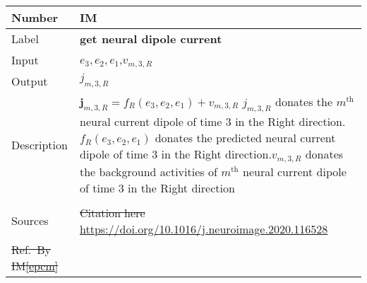 \documentclass[12pt]{article}
\makeatletter
\newcommand{\colAwidth}{0.13\textwidth}
\newcommand{\colBwidth}{0.82\textwidth}
\newcounter{instnum} %
\newcommand{\iref}[1]{IM\ref{#1}}
\providecommand{\DIFdeltex}[1]{{\protect\color{red}\sout{#1}}} %
\providecommand{\DIFaddbegin}{} %
\providecommand{\DIFaddend}{} %
\providecommand{\DIFdelbegin}{} %
\providecommand{\DIFdelend}{} %
\providecommand{\DIFdel}[1]{\texorpdfstring{\DIFdeltex{#1}}{}} %
\newcommand{\DIFscaledelfig}{0.5}
\newlength{\DIFdelgraphicswidth} %
\newlength{\DIFdelgraphicsheight} %
\newcommand{\DIFaddincludegraphics}[2][]{{\color{blue}\fbox{\DIFOincludegraphics[#1]{#2}}}} %
\newcommand{\DIFdelincludegraphics}[2][]{%
\sbox{\DIFdelgraphicsbox}{\DIFOincludegraphics[#1]{#2}}%
\settoboxwidth{\DIFdelgraphicswidth}{\DIFdelgraphicsbox} %
\settoboxtotalheight{\DIFdelgraphicsheight}{\DIFdelgraphicsbox} %
\scalebox{\DIFscaledelfig}{%
\parbox[b]{\DIFdelgraphicswidth}{\usebox{\DIFdelgraphicsbox}\\[-\baselineskip] \rule{\DIFdelgraphicswidth}{0em}}\llap{\resizebox{\DIFdelgraphicswidth}{\DIFdelgraphicsheight}{%
\setlength{\unitlength}{\DIFdelgraphicswidth}%
\begin{picture}(1,1)%
\thicklines\linethickness{2pt} %
{\color[rgb]{1,0,0}\put(0,0){\framebox(1,1){}}}%
{\color[rgb]{1,0,0}\put(0,0){\line( 1,1){1}}}%
{\color[rgb]{1,0,0}\put(0,1){\line(1,-1){1}}}%
\end{picture}%
}\hspace*{3pt}}} %
} %
\DeclareRobustCommand{\DIFaddbegin}{\DIFOaddbegin \let\includegraphics\DIFaddincludegraphics} %
\DeclareRobustCommand{\DIFaddend}{\DIFOaddend \let\includegraphics\DIFOincludegraphics} %
\DeclareRobustCommand{\DIFdelbegin}{\DIFOdelbegin \let\includegraphics\DIFdelincludegraphics} %
\DeclareRobustCommand{\DIFdelend}{\DIFOaddend \let\includegraphics\DIFOincludegraphics} %
\let\sout@orig\sout %
\renewcommand{\sout}[1]{\ifmmode\text{\sout@orig{\ensuremath{#1}}}\else\sout@orig{#1}\fi} %
\makeatother
\begin{document}
~\newline


\noindent
\renewcommand*{\arraystretch}{1.5}%
\begin{tabular}{| p{\colAwidth} | p{\colBwidth}|}
  \hline
  \rowcolor[gray]{0.9}
  Number& IM{instnum}\theinstnum \DIFdelbegin %
\DIFdelend \DIFaddbegin \label{IM1}\DIFaddend \\
  \hline
  Label& \bf get neural dipole current \\
  \hline
  Input&$e_{3}, e_{2}, e_{1}$,$v_{m, 3, R}$\\
  \hline
  Output&${j}_{m, 3, R}$\\
  \hline
  Description&$\boldsymbol{j}_{m, 3, R}=f_{R}\left(e_{3}, e_{2}, e_{1}\right)+v_{m, 3, R}$ ${j}_{m, 3, R}$ donates the
  $m^{\mathrm{th}}$ neural current dipole of time 3 in the Right direction.$f_{R}\left(e_{3}, e_{2}, e_{1}\right)$ donates
  the predicted neural current dipole of time 3 in the Right direction.$v_{m, 3, R}$ donates the background activities of
   $m^{\mathrm{th}}$ neural current dipole of time 3 in the Right direction\\
  \\
  \hline
  Sources& \DIFdelbegin \DIFdel{Citation here }\DIFdelend \DIFaddbegin \url{https://doi.org/10.1016/j.neuroimage.2020.116528} \DIFaddend \\
  \hline
\DIFdelbegin \DIFdel{Ref.\ By }%
\DIFdel{\iref{epcm}}%
\DIFdelend \end{tabular}
\DIFdelbegin %
\DIFdelend %


%
\end{document}
